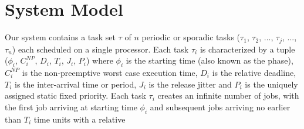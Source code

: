 \section{System Model}\label{sec:system_model}

Our system contains a task set \begin{math}\tau\end{math} of $n$ periodic or sporadic tasks (\begin{math}\tau_{1}\end{math}, \begin{math}\tau_{2}\end{math}, ..., \begin{math}\tau_{j}\end{math}, ..., \begin{math}\tau_{n}\end{math}) each scheduled on a single processor.  Each task \begin{math}\tau_{i}\end{math} is characterized by a tuple (\begin{math}\phi_{i}\end{math}, \begin{math}C_{i}^{NP}\end{math}, \begin{math}D_{i}\end{math}, \begin{math}T_{i}\end{math}, \begin{math}J_{i}\end{math}, \begin{math}P_{i}\end{math}) where \begin{math}\phi_{i}\end{math} is the starting time (also known as the phase), \begin{math}C_{i}^{NP}\end{math} is the non-preemptive worst case execution time, \begin{math}D_{i}\end{math} is the relative deadline, \begin{math}T_{i}\end{math} is the inter-arrival time or period, \begin{math}J_{i}\end{math} is the release jitter and \begin{math}P_{i}\end{math} is the uniquely assigned static fixed priority.  Each task \begin{math}\tau_{i}\end{math} creates an infinite number of jobs, with the first job arriving at starting time \begin{math}\phi_{i}\end{math} and subsequent jobs arriving no earlier than \begin{math}T_{i}\end{math} time units with a relative 